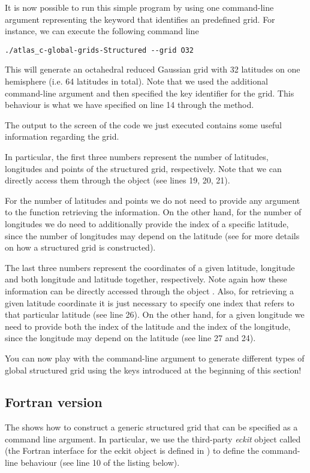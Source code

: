 It is now possible to run this simple program by using one 
command-line argument representing the keyword that identifies 
an \Atlas predefined grid. For instance, we can execute the 
following command line
%
\begin{lstlisting}[style=BashStyle]
./atlas_c-global-grids-Structured --grid O32
\end{lstlisting}
% 
This will generate an octahedral reduced Gaussian grid with 
32 latitudes on one hemisphere (i.e. 64 latitudes in total).
Note that we used the additional command-line argument 
 and then specified the key identifier 
for the grid. This behaviour is what we have specified 
on line 14 through the  method.

The output to the screen of the code we just executed 
contains some useful information regarding the grid. 

In particular, the first three numbers represent the 
number of latitudes, longitudes and points of the structured
grid, respectively. Note that we can directly access them 
through the  object (see lines 19, 20, 21).
\begin{tipbox}
For the number of latitudes and points we do not need to provide
any argument to the function retrieving the information. On the 
other hand, for the number of longitudes we do need to additionally 
provide the index of a specific latitude, since the number of 
longitudes may depend on the latitude (see  
for more details on how a structured grid is constructed). 
\end{tipbox}

The last three numbers represent the coordinates of a given 
latitude, longitude and both longitude and latitude together, 
respectively. Note again how these information can be directly 
accessed through the object . 
Also, for retrieving a given latitude coordinate it is just 
necessary to specify one index that refers to that particular 
latitude (see line 26). On the other hand, for a given longitude 
we need to provide both the index of the latitude and the index 
of the longitude, since the longitude may depend on the latitude 
(see line 27 and 24).

You can now play with the command-line argument to generate 
different types of global structured grid using the keys introduced 
at the beginning of this section!

\subsection{Fortran version}
The  shows how to construct a generic 
structured grid that can be specified as a command line 
argument. In particular, we use the third-party \textit{eckit} 
object called  (the Fortran interface 
for the eckit  object is defined in \Atlas) 
to define the command-line behaviour (see line 10 of the 
listing below). 

